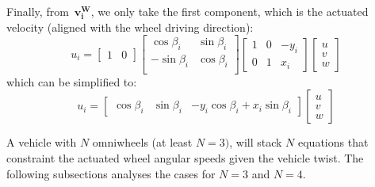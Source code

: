 Finally, from~$\mathbf{v^{W}_i}$, we only take the first component, which is the actuated velocity (aligned with the wheel driving direction): 
\begin{equation}
u_i
=
\left[
\begin{array}{cc}
 1 & 0
\end{array}
\right]
\left[
 \begin{array}{cc}
  \cos \beta_i & \sin \beta_i  \\
  -\sin \beta_i & \cos \beta_i \\
 \end{array}
\right]
\left[
\begin{array}{ccc}
 1 & 0 & -y_i \\
 0 & 1 &  x_i 
\end{array}
\right] 
\left[
\begin{array}{c}
 u \\
 v \\
 w
\end{array}
\right] 
\end{equation}
which can be simplified to: 
\begin{equation}
u_i 
=
\left[
\begin{array}{ccc}
 \cos \beta_i & \sin \beta_i & -y_i\cos \beta_i+x_i \sin \beta_i
\end{array}
\right]
\left[
\begin{array}{c}
 u \\
 v\\
 w
\end{array}
\right]
\label{eq:single_omniwheel_inverse_kniematics}
\end{equation}

A vehicle with $N$ omniwheels (at least $N=3)$, will stack $N$ equations that constraint the actuated wheel angular speeds given the vehicle twist. The following subsections analyses the cases for $N=3$ and $N=4$. 


